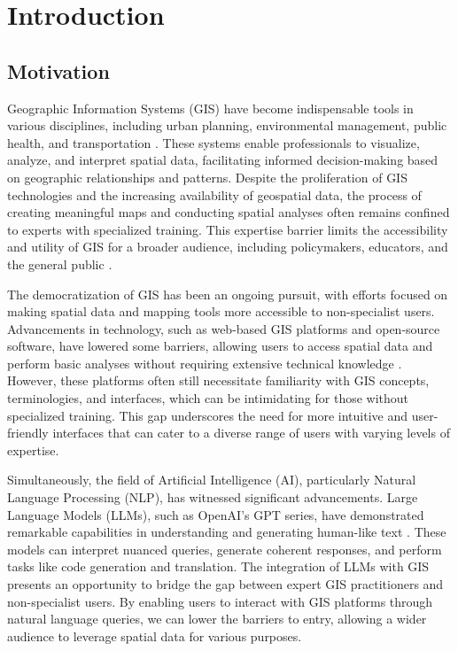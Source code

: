 
%

\chapter{Introduction}
\label{cha:introduction}

\section{Motivation}


Geographic Information Systems (GIS) have become indispensable tools in various disciplines, including urban planning, environmental management, public health, and transportation \cite{longley2015geographic}. These systems enable professionals to visualize, analyze, and interpret spatial data, facilitating informed decision-making based on geographic relationships and patterns. Despite the proliferation of GIS technologies and the increasing availability of geospatial data, the process of creating meaningful maps and conducting spatial analyses often remains confined to experts with specialized training. This expertise barrier limits the accessibility and utility of GIS for a broader audience, including policymakers, educators, and the general public \cite{haklay_neogeography_2013}.

The democratization of GIS has been an ongoing pursuit, with efforts focused on making spatial data and mapping tools more accessible to non-specialist users. Advancements in technology, such as web-based GIS platforms and open-source software, have lowered some barriers, allowing users to access spatial data and perform basic analyses without requiring extensive technical knowledge \cite{malakar_gis_2024}. However, these platforms often still necessitate familiarity with GIS concepts, terminologies, and interfaces, which can be intimidating for those without specialized training. This gap underscores the need for more intuitive and user-friendly interfaces that can cater to a diverse range of users with varying levels of expertise.

Simultaneously, the field of Artificial Intelligence (AI), particularly Natural Language Processing (NLP), has witnessed significant advancements. Large Language Models (LLMs), such as OpenAI's GPT series, have demonstrated remarkable capabilities in understanding and generating human-like text \cite{b_evolution_2024}. These models can interpret nuanced queries, generate coherent responses, and perform tasks like code generation and translation. The integration of LLMs with GIS presents an opportunity to bridge the gap between expert GIS practitioners and non-specialist users. By enabling users to interact with GIS platforms through natural language queries, we can lower the barriers to entry, allowing a wider audience to leverage spatial data for various purposes.

